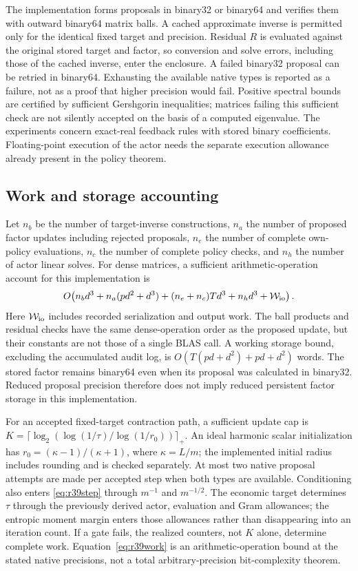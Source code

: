 The implementation forms proposals in binary32 or binary64 and verifies them
with outward binary64 matrix balls. A cached approximate inverse is permitted
only for the identical fixed target and precision. Residual $R$ is evaluated
against the original stored target and factor, so conversion and solve errors,
including those of the cached inverse, enter the enclosure. A failed binary32
proposal can be retried in binary64. Exhausting the available native types is
reported as a failure, not as a proof that higher precision would fail.
Positive spectral bounds are certified by sufficient Gershgorin inequalities;
matrices failing this sufficient check are not silently accepted on the basis
of a computed eigenvalue. The experiments concern exact-real feedback rules
with stored binary coefficients. Floating-point execution of the actor needs
the separate execution allowance already present in the policy theorem.

\subsection{Work and storage accounting}
Let $n_b$ be the number of target-inverse constructions, $n_a$ the number of
proposed factor updates including rejected proposals, $n_e$ the number of
complete own-policy evaluations, $n_c$ the number of complete policy checks,
and $n_h$ the number of actor linear solves. For dense matrices, a sufficient
arithmetic-operation account for this implementation is
\begin{equation}\label{eq:r39work}
 O\!\left(n_bd^3+n_a(pd^2+d^3)
              +(n_e+n_c)Td^3+n_hd^3+\mathcal W_{\rm io}\right).
\end{equation}
Here $\mathcal W_{\rm io}$ includes recorded serialization and output work.
The ball products and residual checks have the same dense-operation order as
the proposed update, but their constants are not those of a single BLAS call.
A working storage bound, excluding the accumulated audit log, is
$O(T(pd+d^2)+pd+d^2)$ words. The stored factor remains binary64 even when its
proposal was calculated in binary32. Reduced proposal precision therefore does
not imply reduced persistent factor storage in this implementation.

For an accepted fixed-target contraction path, a sufficient update cap is
$K=\lceil\log_2(\log(1/\tau)/\log(1/r_0))\rceil_+$.
An ideal harmonic scalar initialization has
$r_0=(\kappa-1)/(\kappa+1)$, where $\kappa=L/m$; the implemented initial
radius includes rounding and is checked separately. At most two native
proposal attempts are made per accepted step when both types are available.
Conditioning also enters \eqref{eq:r39step} through $m^{-1}$ and $m^{-1/2}$.
The economic target determines $\tau$ through the previously derived actor,
evaluation and Gram allowances; the entropic moment margin enters those
allowances rather than disappearing into an iteration count. If a gate fails,
the realized counters, not $K$ alone, determine complete work.
Equation~\eqref{eq:r39work} is an arithmetic-operation bound at the stated
native precisions, not a total arbitrary-precision bit-complexity theorem.

